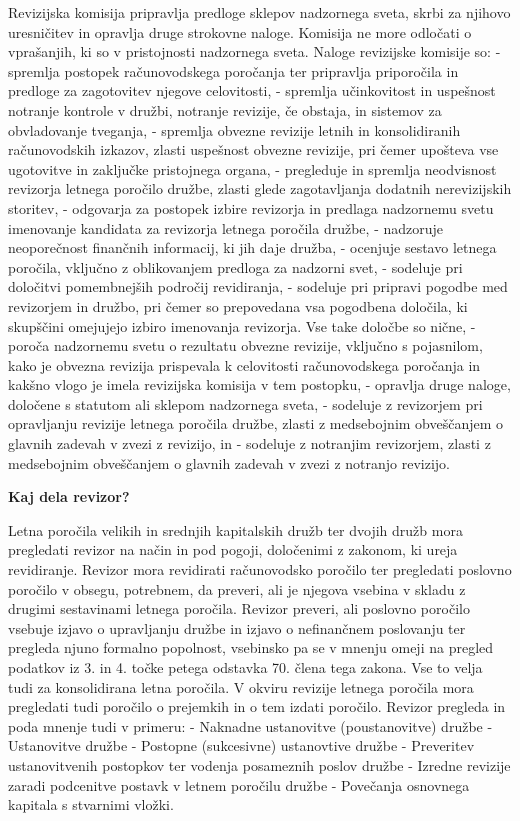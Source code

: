 \documentclass[a4paper,12pt,openright]{book}
\begin{document}
Revizijska komisija pripravlja predloge sklepov nadzornega sveta, skrbi za njihovo uresničitev in opravlja druge strokovne naloge. Komisija ne more odločati o vprašanjih, ki so v pristojnosti nadzornega sveta.
Naloge revizijske komisije so:
- spremlja postopek računovodskega poročanja ter pripravlja priporočila in predloge za zagotovitev njegove celovitosti,
- spremlja učinkovitost in uspešnost notranje kontrole v družbi, notranje revizije, če obstaja, in sistemov za obvladovanje tveganja,
- spremlja obvezne revizije letnih in konsolidiranih računovodskih izkazov, zlasti uspešnost obvezne revizije, pri čemer upošteva vse ugotovitve in zaključke pristojnega organa,
- pregleduje in spremlja neodvisnost revizorja letnega poročilo družbe, zlasti glede zagotavljanja dodatnih nerevizijskih storitev,
- odgovarja za postopek izbire revizorja in predlaga nadzornemu svetu imenovanje kandidata za revizorja letnega poročila družbe,
- nadzoruje neoporečnost finančnih informacij, ki jih daje družba,
- ocenjuje sestavo letnega poročila, vključno z oblikovanjem predloga za nadzorni svet,
- sodeluje pri določitvi pomembnejših področij revidiranja,
- sodeluje pri pripravi pogodbe med revizorjem in družbo, pri čemer so prepovedana vsa pogodbena določila, ki skupščini omejujejo izbiro imenovanja revizorja. Vse take določbe so nične,
- poroča nadzornemu svetu o rezultatu obvezne revizije, vključno s pojasnilom, kako je obvezna revizija prispevala k celovitosti računovodskega poročanja in kakšno vlogo je imela revizijska komisija v tem postopku,
- opravlja druge naloge, določene s statutom ali sklepom nadzornega sveta,
- sodeluje z revizorjem pri opravljanju revizije letnega poročila družbe, zlasti z medsebojnim obveščanjem o glavnih zadevah v zvezi z revizijo, in
- sodeluje z notranjim revizorjem, zlasti z medsebojnim obveščanjem o glavnih zadevah v zvezi z notranjo revizijo.

\textbf{Kaj dela revizor?}

Letna poročila velikih in srednjih kapitalskih družb ter dvojih družb mora pregledati revizor na način in pod pogoji, določenimi z zakonom, ki ureja revidiranje. Revizor mora revidirati računovodsko poročilo ter pregledati poslovno poročilo v obsegu, potrebnem, da preveri, ali je njegova vsebina v skladu z drugimi sestavinami letnega poročila. Revizor preveri, ali poslovno poročilo vsebuje izjavo o upravljanju družbe in izjavo o nefinančnem poslovanju ter pregleda njuno formalno popolnost, vsebinsko pa se v mnenju omeji na pregled podatkov iz 3. in 4. točke petega odstavka 70. člena tega zakona. Vse to velja tudi za konsolidirana letna poročila.
V okviru revizije letnega poročila mora pregledati tudi poročilo o prejemkih in o tem izdati poročilo.
Revizor pregleda in poda mnenje tudi v primeru:
- Naknadne ustanovitve (poustanovitve) družbe
- Ustanovitve družbe
- Postopne (sukcesivne) ustanovtive družbe
- Preveritev ustanovitvenih postopkov ter vodenja posameznih poslov družbe
- Izredne revizije zaradi podcenitve postavk v letnem poročilu družbe
- Povečanja osnovnega kapitala s stvarnimi vložki.
\end{document}
